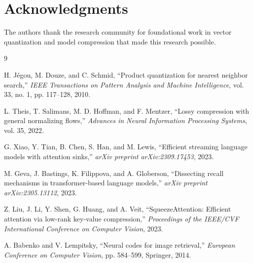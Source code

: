 \documentclass[10pt,conference]{ieeeconf}
\begin{document}
\section*{Acknowledgments}
The authors thank the research community for foundational work in vector quantization and model compression that made this research possible.


\begin{thebibliography}{9}

H. J\'egou, M. Douze, and C. Schmid, ``Product quantization for nearest neighbor search,'' \emph{IEEE Transactions on Pattern Analysis and Machine Intelligence}, vol. 33, no. 1, pp. 117--128, 2010.

L. Theis, T. Salimans, M. D. Hoffman, and F. Mentzer, ``Lossy compression with general normalizing flows,'' \emph{Advances in Neural Information Processing Systems}, vol. 35, 2022.

G. Xiao, Y. Tian, B. Chen, S. Han, and M. Lewis, ``Efficient streaming language models with attention sinks,'' \emph{arXiv preprint arXiv:2309.17453}, 2023.

M. Geva, J. Bastings, K. Filippova, and A. Globerson, ``Dissecting recall mechanisms in transformer-based language models,'' \emph{arXiv preprint arXiv:2305.13112}, 2023.

Z. Liu, J. Li, Y. Shen, G. Huang, and A. Veit, ``SqueezeAttention: Efficient attention via low-rank key-value compression,'' \emph{Proceedings of the IEEE/CVF International Conference on Computer Vision}, 2023.

A. Babenko and V. Lempitsky, ``Neural codes for image retrieval,'' \emph{European Conference on Computer Vision}, pp. 584--599, Springer, 2014.

\end{thebibliography}
\end{document}
